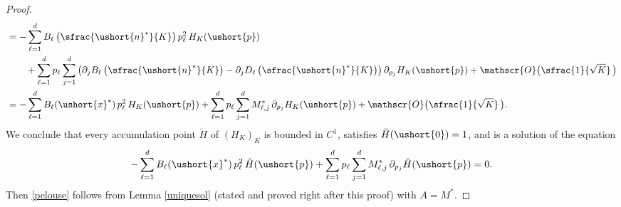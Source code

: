 \documentclass[10pt]{amsart}
\let\mathcal\mathscr
\numberwithin{equation}{section}
\theoremstyle{plain}
\theoremstyle{definition}
\newcommand{\sK}{K}
\newcommand{\vecnf}{\ushort{n}^*}
\newcommand{\vecxf}{\ushort{x}^*}
\newcommand{\vp}{\ushort{p}}
\begin{document}
\begin{proof}
\begin{align*}
& = -\sum_{\ell=1}^{d}B_{\ell}\left(\sfrac{\vecnf}{K}\right) p_{\ell}^2\, H_{\sK}(\vp)\\
& \qquad +\sum_{\ell=1}^{d}p_{\ell}
\sum_{j=1}^{d}\left(\partial_{j}B_{\ell}\left(\sfrac{\vecnf}{K}\right)-\partial_{j}D_{\ell}\left(\sfrac{\vecnf}{K}\right)\right)\partial_{p_{j}}H_{\sK}(\vp)+\mathcal{O}\bigl(\sfrac{1}{\sqrt{K}}\,\bigr)\\
& =-\sum_{\ell=1}^{d}B_{\ell}(\vecxf)\,p_{\ell}^2\,H_{\sK}(\vp)+\sum_{\ell=1}^{d} p_{\ell}\sum_{j=1}^{d}
M_{\ell,j}^*\,\partial_{p_{j}}H_{\sK}(\vp)+\mathcal{O}\bigl(\sfrac{1}{\sqrt{K}}\,\bigr).
\end{align*}
We conclude that every accumulation point $\breve{H}$ of $(H_{\sK})_{\sK}$ is bounded in
$C^{1}$, satisfies $\breve{H}(\ushort{0})=1$, and is a solution of the equation
\[
-\sum_{\ell=1}^{d}B_{\ell}(\vecxf)\,p_{\ell}^2\,\breve{H}(\vp)+\sum_{\ell=1}^{d} p_{\ell}\sum_{j=1}^{d}
M_{\ell,j}^*\,\partial_{p_{j}}\breve{H}(\vp)=0.
\]
Then \eqref{pelouse} follows from Lemma \ref{uniquesol} (stated and proved right after this proof) with $A=M^*$.
\end{proof}
\end{document}
